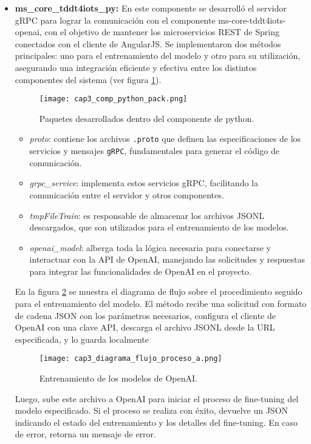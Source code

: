 \begin{itemize}
	\newpage
	\item \textbf{ms\_core\_tddt4iots\_py: } En este componente se desarrolló el servidor gRPC para lograr la comunicación con el componente ms-core-tddt4iots-openai, con el objetivo de mantener los microservicios REST de Spring conectados con el cliente de AngularJS. Se implementaron dos métodos principales: uno para el entrenamiento del modelo y otro para su utilización, asegurando una integración eficiente y efectiva entre los distintos componentes del sistema (ver figura \ref{fig:cap3_comp_python_pack}).
	
	\begin{figure}[H]  
		\centering
		\texttt{[image: cap3\_comp\_python\_pack.png]}
		\caption{Paquetes desarrollados dentro del componente de python.}
		\label{fig:cap3_comp_python_pack}
	\end{figure}
		
	\begin{itemize}
		\item \textit{proto}: contiene los archivos \texttt{.proto} que definen las especificaciones de los servicios y mensajes \texttt{gRPC}, fundamentales para generar el código de comunicación.
		\item \textit{grpc\_service}: implementa estos servicios gRPC, facilitando la comunicación entre el servidor y otros componentes.
		\item \textit{tmpFileTrain}: es responsable de almacenar los archivos JSONL descargados, que son utilizados para el entrenamiento de los modelos.
		\item \textit{openai\_model}: alberga toda la lógica necesaria para conectarse y interactuar con la API de OpenAI, manejando las solicitudes y respuestas para integrar las funcionalidades de OpenAI en el proyecto.
	\end{itemize}
	
	
	En la figura \ref{fig:cap3_diagrama_flujo_proceso_a} se muestra el diagrama de flujo sobre el procedimiento seguido para el entrenamiento del modelo. El método recibe una solicitud con formato de cadena JSON con los parámetros necesarios, configura el cliente de OpenAI con una clave API, descarga el archivo JSONL desde la URL especificada, y lo guarda localmente

	\begin{figure}[H]  
		\centering
		\texttt{[image: cap3\_diagrama\_flujo\_proceso\_a.png]}
		\caption{Entrenamiento de los modelos de OpenAI.}
		\label{fig:cap3_diagrama_flujo_proceso_a}
	\end{figure}
	Luego, sube este archivo a OpenAI para iniciar el proceso de fine-tuning del modelo especificado. Si el proceso se realiza con éxito, devuelve un JSON indicando el estado del entrenamiento y los detalles del fine-tuning. En caso de error, retorna un mensaje de error.
	

\end{itemize}
